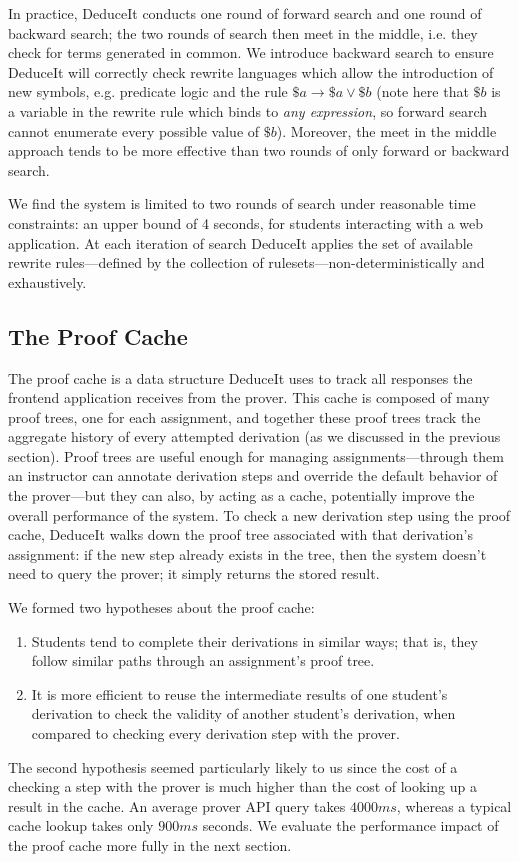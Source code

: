 \documentclass{sigchi}
\begin{document}
In practice, DeduceIt conducts one round of forward search and one round of backward search; the two rounds of search then meet in the middle, i.e. they check for terms generated in common. We introduce backward search to ensure DeduceIt will correctly check rewrite languages which allow the introduction of new symbols, e.g. predicate logic and the rule $\$a \rightarrow \$a \vee \$b$ (note here that $\$b$ is a variable in the rewrite rule which binds to \textit{any expression}, so forward search cannot enumerate every possible value of $\$b$). Moreover, the meet in the middle approach tends to be more effective than two rounds of only forward or backward search. 

We find the system is limited to two rounds of search under reasonable time constraints: an upper bound of 4 seconds, for students interacting with a web application. At each iteration of search DeduceIt applies the set of available rewrite rules---defined by the collection of rulesets---non-deterministically and exhaustively. 

\subsection{The Proof Cache}

The proof cache is a data structure DeduceIt uses to track all responses the frontend application receives from the prover. This cache is composed of many proof trees, one for each assignment, and together these proof trees track the aggregate history of every attempted derivation (as we discussed in the previous section). Proof trees are useful enough for managing assignments---through them an instructor can annotate derivation steps and override the default behavior of the prover---but they can also, by acting as a cache, potentially improve the overall performance of the system. To check a new derivation step using the proof cache, DeduceIt walks down the proof tree associated with that derivation's assignment: if the new step already exists in the tree, then the system doesn't need to query the prover; it simply returns the stored result.

We formed two hypotheses about the proof cache:
\begin{enumerate}
  \item Students tend to complete their derivations in similar ways; that is, they follow similar paths through an assignment's proof tree.
  \item It is more efficient to reuse the intermediate results of one student's derivation to check the validity of another student's derivation, when compared to checking every derivation step with the prover. 
\end{enumerate}  
  The second hypothesis seemed particularly likely to us since the cost of a checking a step with the prover is much higher than the cost of looking up a result in the cache. An average prover API query takes $4000ms$, whereas a typical cache lookup takes only $900ms$ seconds. We evaluate the performance impact of the proof cache more fully in the next section.
\end{document}
